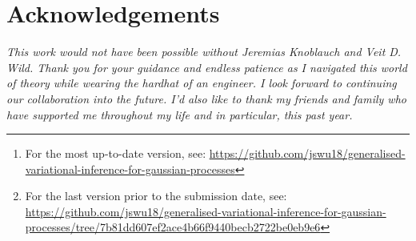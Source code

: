 \documentclass{article}
\numberwithin{equation}{section}
\begin{document}
\begin{abstract}
Proposed by \cite{knoblauch2022optimization}, generalised variational inference (GVI) is a learning framework motivated by an optimisation-centric interpretation of Bayesian inference. 
Extending GVI to infinite dimensions, \cite{wild2022generalized} introduces Gaussian Wasserstein Inference (GWI) in function spaces. 
GWI demonstrates a new inference approach for variational GPs, circumventing many limitations of previous approaches.
Our work introduces various improvements to GWI for GPs, including new kernel parameterisations such as the NNGP kernels from \cite{novak2019neural}. We also introduce a new learning framework that we call projected GVI (pGVI) for GPs. 
pGVI weakens the GVI assumptions of a definite regulariser.
Instead, we propose regularising between scalar projections of the stochastic processes, an approach we call projected regularisation.
We demonstrate that pGVI is a highly flexible and well-performing variational inference framework with significantly cheaper linearly scaling computational costs compared to the cubic costs of existing approaches.
We also present our learning frameworks through a comprehensive software implementation available on 
\href{https://github.com/jswu18/generalised-variational-inference-for-gaussian-processes}{GitHub}\footnote{For the most up-to-date version, see: \href{https://github.com/jswu18/generalised-variational-inference-for-gaussian-processes}{https://github.com/jswu18/generalised-variational-inference-for-gaussian-processes}} 
\footnote{
For the last version prior to the submission date, see: \href{https://github.com/jswu18/generalised-variational-inference-for-gaussian-processes/tree/7b81dd607ef2ace4b66f9440becb2722be0eb9e6}{https://github.com/jswu18/generalised-variational-inference-for-gaussian-processes/tree/7b81dd607ef2ace4b66f9440becb2722be0eb9e6}}.
\end{abstract}

\newpage
\section*{Acknowledgements}
\textit{This work would not have been possible without Jeremias Knoblauch and Veit D. Wild. 
Thank you for your guidance and endless patience as I navigated this world of theory while wearing the hardhat of an engineer. 
I look forward to continuing our collaboration into the future.
I’d also like to thank my friends and family who have supported me throughout my life and in particular, this past year. 
}
\end{document}
